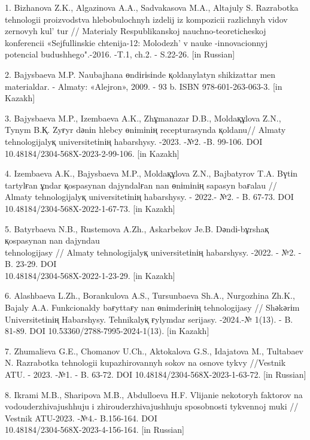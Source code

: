\begin{references}
1. Bizhanova Z.K., Algazinova A.A., Sadvakasova M.A., Altajuly S.
Razrabotka tehnologii proizvodstva hlebobulochnyh izdelij iz kompozicii
razlichnyh vidov zernovyh kul' tur // Materialy
Respublikanskoj nauchno-teoreticheskoj konferencii «Sejfullinskie
chtenija-12: Molodezh'{} v nauke -innovacionnyj \\potencial
budushhego".-2016. -T.1, ch.2. - S.22-26. {[}in Russian{]}

2. Bajysbaeva M.P. Naubajhana өndіrіsіnde қoldanylatyn shikіzattar men
materialdar. - Almaty: «Alejron», 2009. - 93 b. ISBN 978-601-263-063-3.
{[}in Kazakh{]}

3. Bajysbaeva M.P., Izembaeva A.K., Zhұmanazar D.B., Moldaқұlova Z.N.,
Tynym B.Қ. Zyғyr dәnіn hlebcy өnіmіnің recepturasynda қoldanu// Almaty
tehnologijalyқ universitetіnің habarshysy. -2023. -№2. -B. 99-106. DOI
10.48184/2304-568X-2023-2-99-106. {[}in Kazakh{]}

4. Izembaeva A.K., Bajysbaeva M.P., Moldaқұlova Z.N., Bajbatyrov T.A.
Bүtіn tartylғan ұndar қospasynan dajyndalғan nan өnіmіnің sapasyn
baғalau // Almaty tehnologijalyқ universitetіnің habarshysy. - 2022.-
№2. - B. 67-73. DOI 10.48184/2304-568X-2022-1-67-73. {[}in Kazakh{]}

5. Batyrbaeva N.B., Rustemova A.Zh., Askarbekov Je.B. Dәndі-bұrshaқ
қospasynan nan dajyndau \\tehnologijasy // Almaty tehnologijalyқ
universitetіnің habarshysy. -2022. - №2. -B. 23-29. DOI\\
10.48184/2304-568X-2022-1-23-29. {[}in Kazakh{]}

6. Alashbaeva L.Zh., Borankulova A.S., Tursunbaeva Sh.A., Nurgozhina
Zh.K., Bajaly A.A. Funkcionaldy baғyttaғy nan өnіmderіnің tehnologijasy
// Shәkәrіm Universitetіnің Habarshysy. Tehnikalyқ ғylymdar serijasy.
-2024.-№ 1(13). - B. 81-89. DOI 10.53360/2788-7995-2024-1(13). {[}in
Kazakh{]}

7. Zhumalieva G.E., Chomanov U.Ch., Aktokalova G.S., Idajatova M.,
Tultabaev N. Razrabotka tehnologii kupazhirovannyh sokov na osnove tykvy
//Vestnik ATU. - 2023. -№1. - B. 63-72. DOI
10.48184/2304-568X-2023-1-63-72. {[}in Russian{]}

8. Ikrami M.B., Sharipova M.B., Abdulloeva H.F. Vlijanie nekotoryh
faktorov na vodouderzhivajushhuju i zhirouderzhivajushhuju sposobnosti
tykvennoj muki // Vestnik ATU-2023. -№4.- B.156-164. DOI\\
10.48184/2304-568X-2023-4-156-164. {[}in Russian{]}


\end{references}
